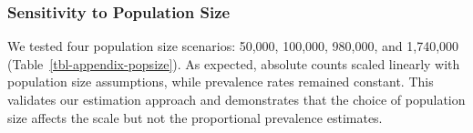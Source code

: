 \documentclass[
  12pt,
  letterpaper,
  DIV=11,
  numbers=noendperiod]{scrartcl}
\theoremstyle{plain}
\theoremstyle{definition}
\begin{document}
{\begin{table}
{}

\end{table}%

\subsubsection{Sensitivity to Population
Size}\label{sensitivity-to-population-size}

We tested four population size scenarios: 50,000, 100,000, 980,000, and
1,740,000 (Table~\ref{tbl-appendix-popsize}). As expected, absolute
counts scaled linearly with population size assumptions, while
prevalence rates remained constant. This validates our estimation
approach and demonstrates that the choice of population size affects the
scale but not the proportional prevalence estimates.

\begin{table}

\caption{\label{tbl-appendix-popsize}Sensitivity Analysis: Population
Size Comparison. All estimates use neighborhood bootstrap, SS weights,
and MBSU (Moderate) adjustment. Source: Authors' Own Work.}

\centering{

\centering\begingroup\fontsize{8}{10}\selectfont

}
\end{table}}
\end{document}
